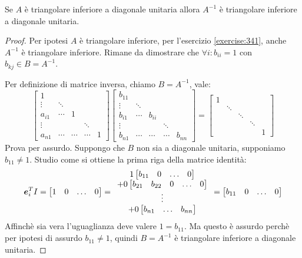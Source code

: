 \begin{exercise}[3.4]
Se $A$ \`e triangolare inferiore a diagonale unitaria allora $A^{-1}$ \`e
triangolare inferiore a diagonale unitaria.
\end{exercise}
\begin{proof}
Per ipotesi $A$ \`e triangolare inferiore, per l'esercizio \ref{exercise:341},
anche $A^{-1}$ \`e triangolare inferiore. Rimane da dimostrare che
$\forall i: b_{ii} = 1$ con $b_{kj} \in B = A^{-1}$.

Per definizione di matrice inversa, chiamo $B = A^{-1}$, vale:
\begin{displaymath}
\begin{bmatrix}
1 \\
\vdots & \ddots \\
a_{i1} & \cdots & 1 \\
\vdots & 		&		& \ddots\\
a_{n1} & \cdots & \cdots &\cdots & 1
\end{bmatrix} %
\begin{bmatrix}
b_{11} \\
\vdots & \ddots \\
b_{i1} & \cdots & b_{ii} \\
\vdots & 		&		& \ddots \\
b_{n1} & \cdots & \cdots &\cdots & b_{nn}
\end{bmatrix} =
\begin{bmatrix}
1 \\
 & \ddots \\
 & 		& \ddots \\
 & 		&		& \ddots\\
 &  	&  		&		& 1
\end{bmatrix}
\end{displaymath}
Prova per assurdo. Suppongo che $B$ non sia a diagonale unitaria, supponiamo
$b_{11} \not = 1$.
Studio come si ottiene la prima riga della matrice identit\`a:
\begin{displaymath}
\boldsymbol{e}_{i}^{T} I = 
\begin{bmatrix}
1 & 0 & \ldots & 0
\end{bmatrix} = 
\begin{array}{c}
1
	\begin{bmatrix}
	b_{11} & 0 & \ldots & 0
	\end{bmatrix} \\
+ 0
	\begin{bmatrix}
	b_{21} & b_{22} & 0 & \ldots & 0
	\end{bmatrix}  \\
\vdots \\
+ 0
	\begin{bmatrix}
	b_{n1} & \ldots & b_{nn}
	\end{bmatrix}
\end{array} =
	\begin{bmatrix}
	b_{11} & 0 & \ldots & 0
	\end{bmatrix} 
\end{displaymath}
Affinch\`e sia vera l'uguaglianza deve valere $1 = b_{11}$. Ma questo \`e
assurdo perch\`e per ipotesi di assurdo $b_{11} \not = 1$, quindi $B=A^{-1}$ \`e
triangolare inferiore a diagonale unitaria.
\end{proof}


